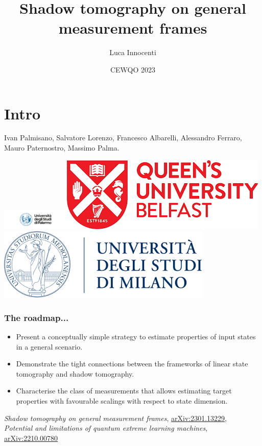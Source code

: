 \documentclass{beamer}
\title{Shadow tomography on general measurement frames}
\author{Luca Innocenti}
\date{CEWQO 2023}
\begin{document}
\section{Intro}

\begin{frame}
  \titlepage
  \begin{center}
      \scriptsize
  Ivan Palmisano, Salvatore Lorenzo, Francesco Albarelli, Alessandro Ferraro, Mauro Paternostro, Massimo Palma.
  \end{center}
  \hfill\includegraphics[height=1cm]{figures/logo-unipa-2020.png}\includegraphics[height=1.cm]{figures/qub_logo.png}\quad\includegraphics[height=1.cm]{figures/unimilogo.png}
\end{frame}


\begin{frame}
  \frametitle{The roadmap...}
  
  \begin{itemize}\setlength\itemsep{1em}
      \item Present a conceptually simple strategy to estimate properties of input states in a general scenario.
      \item Demonstrate the tight connections between the frameworks of linear state tomography and shadow tomography.
      \item Characterise the class of measurements that allows estimating target properties with favourable scalings with respect to state dimension.
  \end{itemize}
  \vspace{1cm}
  \begin{flushright}\scriptsize
      \textit{Shadow tomography on general measurement frames}, \href{https://arxiv.org/abs/2301.13229}{arXiv:2301.13229},
      \\
      \textit{Potential and limitations of quantum extreme learning machines}, \href{https://arxiv.org/abs/2210.00780}{arXiv:2210.00780}
  \end{flushright}  
\end{frame}
\end{document}
